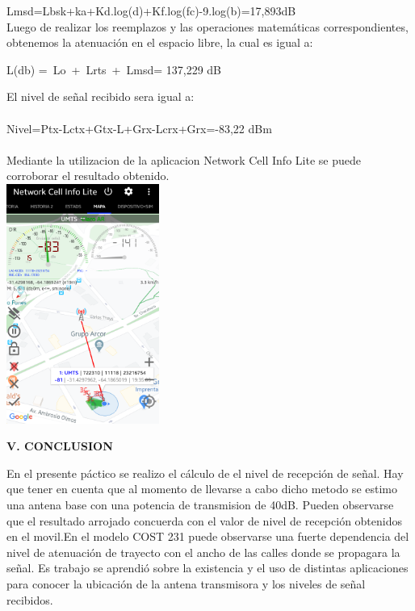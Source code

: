 \documentclass[conference, 9pt, a4paper]{IEEEtran}
\begin{document}
Lmsd=Lbsk+ka+Kd.log(d)+Kf.log(fc)-9.log(b)=17,893dB\\

Luego de realizar los reemplazos y las operaciones matemáticas correspondientes, obtenemos la atenuación en el espacio libre, la cual es igual a:\\
\begin{center}

L(db) =\ Lo\ +\ Lrts\ +\ Lmsd= 137,229 dB
\end{center}
El nivel de señal recibido sera igual a:\\
\\
Nivel=Ptx-Lctx+Gtx-L+Grx-Lcrx+Grx=-83,22 dBm\\
\\
Mediante la utilizacion de la aplicacion Network Cell Info Lite se puede corroborar el resultado obtenido.\\

\includegraphics[width=5cm]{image/Screenshot_2020-06-26-19-35-34-1.png}

\begin{center}
\textbf{V. CONCLUSION}
\end{center}
En el presente páctico se realizo el cálculo de el nivel de recepción de señal.
Hay que tener en cuenta que al momento de llevarse a cabo dicho metodo se estimo una antena base con una potencia de transmision de 40dB.
Pueden observarse que el resultado  arrojado concuerda con el valor  de nivel de recepción obtenidos en el movil.En el 
modelo COST 231 puede observarse una fuerte dependencia del nivel de atenuación de trayecto con el ancho de las calles donde se propagara la señal.
Es trabajo se  aprendió  sobre la existencia y el uso de distintas aplicaciones  para conocer la ubicación de la antena transmisora y  los niveles de señal recibidos. 
\end{document}
